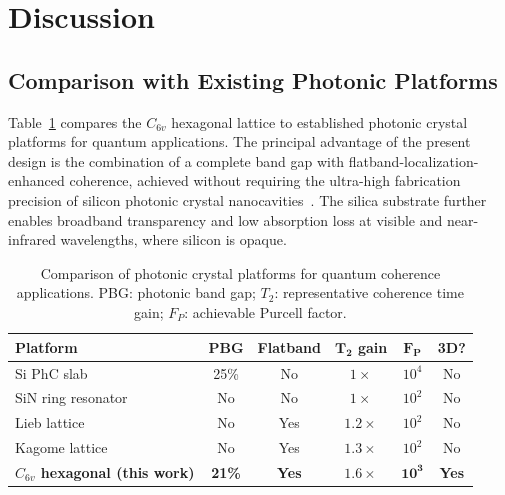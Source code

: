\documentclass[10pt,letterpaper]{article}
\begin{document}

\section{Discussion}
\label{sec:discussion}

\subsection{Comparison with Existing Photonic Platforms}

Table~\ref{tab:comparison} compares the $C_{6v}$ hexagonal lattice to established photonic crystal platforms for quantum applications. The principal advantage of the present design is the combination of a complete band gap with flatband-localization-enhanced coherence, achieved without requiring the ultra-high fabrication precision of silicon photonic crystal nanocavities~\cite{Akahane2003}. The silica substrate further enables broadband transparency and low absorption loss at visible and near-infrared wavelengths, where silicon is opaque.

\begin{table}[h]
\centering
\caption{Comparison of photonic crystal platforms for quantum coherence applications. PBG: photonic band gap; $T_2$: representative coherence time gain; $F_P$: achievable Purcell factor.}
\label{tab:comparison}
\begin{tabular}{lccccc}
\toprule
\textbf{Platform} & \textbf{PBG} & \textbf{Flatband} & $\boldsymbol{T_2}$ \textbf{gain} & $\boldsymbol{F_P}$ & \textbf{3D?} \\
\midrule
Si PhC slab~\cite{Akahane2003} & 25\% & No & $1\times$ & $10^4$ & No \\
SiN ring resonator~\cite{Kosaka1998} & No & No & $1\times$ & $10^2$ & No \\
Lieb lattice~\cite{Lustig2019} & No & Yes & $1.2\times$ & $10^2$ & No \\
Kagome lattice~\cite{Pertsch2002} & No & Yes & $1.3\times$ & $10^2$ & No \\
\textbf{$C_{6v}$ hexagonal (this work)} & \textbf{21\%} & \textbf{Yes} & $\boldsymbol{1.6\times}$ & $\boldsymbol{10^3}$ & \textbf{Yes} \\
\bottomrule
\end{tabular}
\end{table}
\end{document}
